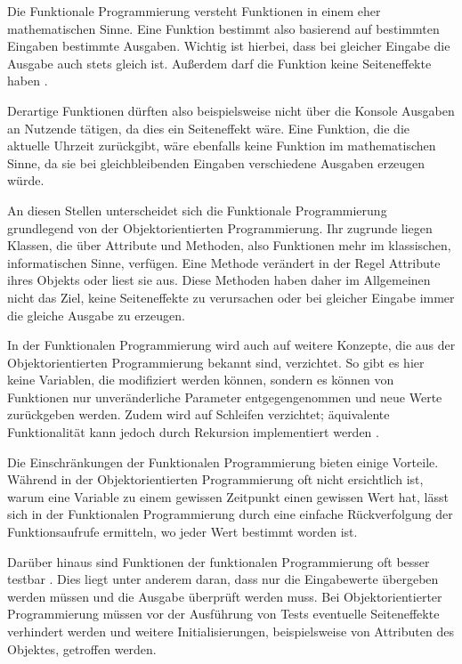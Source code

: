 Die Funktionale Programmierung versteht Funktionen in einem eher mathematischen Sinne. Eine Funktion bestimmt also basierend auf bestimmten Eingaben bestimmte Ausgaben. Wichtig ist hierbei, dass bei gleicher Eingabe die Ausgabe auch stets gleich ist. Außerdem darf die Funktion keine Seiteneffekte haben \cite{hinsen2009functional_programming}.

Derartige Funktionen dürften also beispielsweise nicht über die Konsole Ausgaben an Nutzende tätigen, da dies ein Seiteneffekt wäre. Eine Funktion, die die aktuelle Uhrzeit zurückgibt, wäre ebenfalls keine Funktion im mathematischen Sinne, da sie bei gleichbleibenden Eingaben verschiedene Ausgaben erzeugen würde.

An diesen Stellen unterscheidet sich die Funktionale Programmierung grundlegend von der Objektorientierten Programmierung. Ihr zugrunde liegen Klassen, die über Attribute und Methoden, also Funktionen mehr im klassischen, informatischen Sinne, verfügen. Eine Methode verändert in der Regel Attribute ihres Objekts oder liest sie aus. Diese Methoden haben daher im Allgemeinen nicht das Ziel, keine Seiteneffekte zu verursachen oder bei gleicher Eingabe immer die gleiche Ausgabe zu erzeugen.

In der Funktionalen Programmierung wird auch auf weitere Konzepte, die aus der Objektorientierten Programmierung bekannt sind, verzichtet. So gibt es hier keine Variablen, die modifiziert werden können, sondern es können von Funktionen nur unveränderliche Parameter entgegengenommen und neue Werte zurückgeben werden. Zudem wird auf Schleifen verzichtet; äquivalente Funktionalität kann jedoch durch Rekursion implementiert werden \cite{hinsen2009functional_programming}.

Die Einschränkungen der Funktionalen Programmierung bieten einige Vorteile. Während in der Objektorientierten Programmierung oft nicht ersichtlich ist, warum eine Variable zu einem gewissen Zeitpunkt einen gewissen Wert hat, lässt sich in der Funktionalen Programmierung durch eine einfache Rückverfolgung der Funktionsaufrufe ermitteln, wo jeder Wert bestimmt worden ist.

Darüber hinaus sind Funktionen der funktionalen Programmierung oft besser testbar \cite{hinsen2009functional_programming} \cite{benton2016js_functional}. Dies liegt unter anderem daran, dass nur die Eingabewerte übergeben werden müssen und die Ausgabe überprüft werden muss. Bei Objektorientierter Programmierung müssen vor der Ausführung von Tests eventuelle Seiteneffekte verhindert werden und weitere Initialisierungen, beispielsweise von Attributen des Objektes, getroffen werden.

